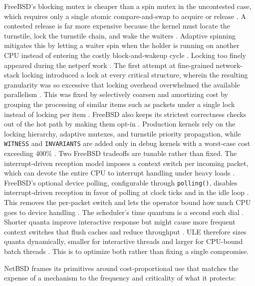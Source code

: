 FreeBSD's blocking mutex is cheaper than a spin mutex in the uncontested case, which requires only a single atomic
compare-and-swap to acquire or release \parencite{mckusick2014_process}. A contested release is far more expensive because the
kernel must locate the turnstile, lock the turnstile chain, and wake the waiters \parencite{mckusick2014_process}.
Adaptive spinning mitigates this by letting a waiter spin when the holder is running on another CPU instead of
entering the costly block-and-wakeup cycle \parencite{mckusick2014_process}. Locking too finely appeared during the netperf work
\parencite{freebsd_netperf}. The first attempt at fine-grained network-stack locking introduced a lock at every critical
structure, wherein the resulting granularity was so excessive that locking overhead overwhelmed the available
parallelism \parencite{freebsd_netperf}. This was fixed by selectively coarsen and amortizing cost by grouping the
processing of similar items such as packets under a single lock instead of locking per item \parencite{freebsd_netperf}.
FreeBSD also keeps its strictest correctness checks out of the hot path by making them opt-in \parencite{mckusick2014_process}.
Production kernels rely on the locking hierarchy, adaptive mutexes, and turnstile priority propagation,
while \texttt{WITNESS} and \texttt{INVARIANTS} are added only in debug kernels with a worst-case cost exceeding
400\% \parencite{mckusick2014_process}. Two FreeBSD tradeoffs are tunable rather than fixed. The interrupt-driven
reception model imposes a context switch per incoming packet, which can devote the entire CPU to interrupt handling
under heavy loads \parencite{freebsd_polling}. FreeBSD's optional device polling, configurable through \texttt{polling()},
disables interrupt-driven reception in favor of polling at clock ticks and in the idle loop \parencite{freebsd_polling}. This
removes the per-packet switch and lets the operator bound how much CPU goes to device handling \parencite{freebsd_polling}.
The scheduler's time quantum is a second such dial \parencite{mckusick2014_process}. Shorter quanta improve
interactive response but might cause more frequent context switches that flush caches and reduce throughput
\parencite{mckusick2014_process}. ULE therefore sizes quanta dynamically, smaller for interactive threads and
larger for CPU-bound batch threads \parencite{mckusick2014_process}. This is to optimize both rather than fixing
a single compromise.

NetBSD frames its primitives around cost-proportional use that matches the expense of a mechanism to the frequency
and criticality of what it protects:


